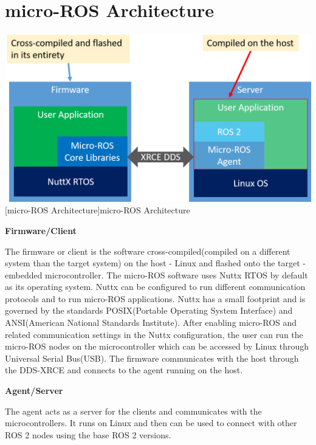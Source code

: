 \documentclass[%
xelatex,
	oneside,		%
	12pt,			%
	parskip=half,	%
	abstracton,
	chapterprefix=true%
    appendixprefix=true]
{scrbook}
\begin{document}
	\section{micro-ROS Architecture}
		\vspace*{0.5cm}
\begin{center}
\includegraphics[scale=0.4]{fig/uros_arc.jpg}
[micro-ROS Architecture]{micro-ROS Architecture\cite{urosarc}}
\label{fig:urosarc}
\end{center}

 
 
 {\bfseries Firmware/Client}
 
 
 \vspace*{0.5cm}
 The firmware or client is the software cross-compiled(compiled on a different system than the target system) on the host - Linux and flashed onto the target - embedded microcontroller. The micro-ROS software uses Nuttx RTOS by default as its operating system. Nuttx can be configured to run different communication protocols and to run micro-ROS applications. Nuttx has a small footprint and is governed by the standards POSIX(Portable Operating System Interface) and ANSI(American National Standards Institute). After enabling micro-ROS and related communication settings in the Nuttx configuration, the user can run the micro-ROS nodes on the microcontroller which can be accessed by Linux through Universal Serial Bus(USB). The firmware communicates with the host through the DDS-XRCE and connects to the agent running on the host.
 \vspace*{0.5cm}
 
 {\bfseries Agent/Server}
 
 
 \vspace*{0.5cm}
 The agent acts as a server for the clients and communicates with the microcontrollers. It runs on Linux and then can be used to connect with other ROS 2 nodes using the base ROS 2 versions.
 
\end{document}
